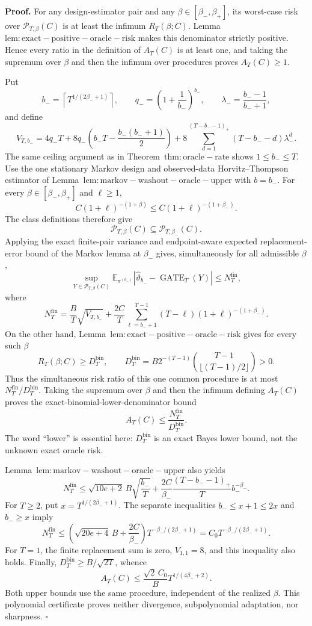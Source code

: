 \textbf{Proof.} For any design-estimator pair and any \(\beta\in[\beta_-,\beta_+]\), its worst-case risk over \(\mathcal P_{T,\beta}(C)\) is at least the infimum \(R_T(\beta;C)\). Lemma~\(\mathrm{lem:exact-positive-oracle-risk}\) makes this denominator strictly positive. Hence every ratio in the definition of \(A_T(C)\) is at least one, and taking the supremum over \(\beta\) and then the infimum over procedures proves \(A_T(C)\ge1\).

Put
\[
b_-=\left\lceil T^{1/(2\beta_-+1)}\right\rceil,
\qquad
q_-=\left(1+\frac1{b_-}\right)^{b_-},
\qquad
\lambda_-=\frac{b_--1}{b_-+1},
\]
and define
\[
V_{T,b_-}=4q_-T+8q_-\left(b_-T-\frac{b_-(b_-+1)}2\right)
+8\sum_{d=1}^{(T-b_--1)_+}(T-b_--d)\lambda_-^d.
\]
The same ceiling argument as in Theorem~\(\mathrm{thm:oracle-rate}\) shows \(1\le b_-\le T\). Use the one stationary Markov design and observed-data Horvitz--Thompson estimator of Lemma~\(\mathrm{lem:markov-washout-oracle-upper}\) with \(b=b_-\). For every \(\beta\in[\beta_-,\beta_+]\) and \(\ell\ge1\),
\[
C(1+\ell)^{-(1+\beta)}
\le C(1+\ell)^{-(1+\beta_-)}.
\]
The class definitions therefore give
\[
\mathcal P_{T,\beta}(C)\subseteq\mathcal P_{T,\beta_-}(C).
\]
Applying the exact finite-pair variance and endpoint-aware expected replacement-error bound of the Markov lemma at \(\beta_-\) gives, simultaneously for all admissible \(\beta\),
\[
\sup_{Y\in\mathcal P_{T,\beta}(C)}
\mathbb E_{\pi^{(b_-)}}
|\widehat\vartheta_{b_-}-\operatorname{GATE}_T(Y)|
\le N_T^{\mathrm{fin}},
\]
where
\[
N_T^{\mathrm{fin}}
=\frac BT\sqrt{V_{T,b_-}}
+\frac{2C}{T}\sum_{\ell=b_-+1}^{T-1}(T-\ell)(1+\ell)^{-(1+\beta_-)}.
\]
On the other hand, Lemma~\(\mathrm{lem:exact-positive-oracle-risk}\) gives for every such \(\beta\)
\[
R_T(\beta;C)\ge D_T^{\mathrm{bin}},
\qquad
D_T^{\mathrm{bin}}
=B2^{-(T-1)}\binom{T-1}{\lfloor(T-1)/2\rfloor}>0.
\]
Thus the simultaneous risk ratio of this one common procedure is at most \(N_T^{\mathrm{fin}}/D_T^{\mathrm{bin}}\). Taking the supremum over \(\beta\) and then the infimum defining \(A_T(C)\) proves the exact-binomial-lower-denominator bound
\[
A_T(C)\le\frac{N_T^{\mathrm{fin}}}{D_T^{\mathrm{bin}}}.
\]
The word ``lower'' is essential here: \(D_T^{\mathrm{bin}}\) is an exact Bayes lower bound, not the unknown exact oracle risk.

Lemma~\(\mathrm{lem:markov-washout-oracle-upper}\) also yields
\[
N_T^{\mathrm{fin}}
\le \sqrt{10e+2}\,B\sqrt{\frac{b_-}{T}}
+\frac{2C}{\beta_-}\frac{(T-b_--1)_+}{T}b_-^{-\beta_-}.
\]
For \(T\ge2\), put \(x=T^{1/(2\beta_-+1)}\). The separate inequalities \(b_-\le x+1\le2x\) and \(b_-\ge x\) imply
\[
N_T^{\mathrm{fin}}
\le\left(\sqrt{20e+4}\,B+\frac{2C}{\beta_-}\right)
T^{-\beta_-/(2\beta_-+1)}
=C_0T^{-\beta_-/(2\beta_-+1)}.
\]
For \(T=1\), the finite replacement sum is zero, \(V_{1,1}=8\), and this inequality also holds. Finally, \(D_T^{\mathrm{bin}}\ge B/\sqrt{2T}\), whence
\[
A_T(C)\le\frac{\sqrt2\,C_0}{B}T^{1/(4\beta_-+2)}.
\]
Both upper bounds use the same procedure, independent of the realized \(\beta\). This polynomial certificate proves neither divergence, subpolynomial adaptation, nor sharpness. \(\square\)
